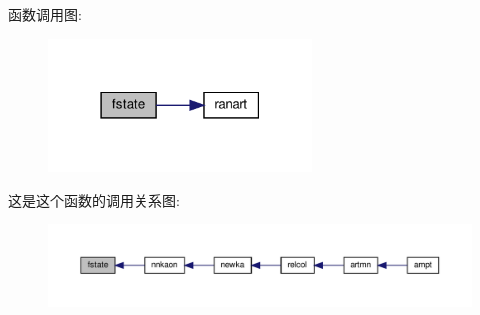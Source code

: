函数调用图\+:
\nopagebreak
\begin{figure}[H]
\begin{center}
\leavevmode
\includegraphics[width=198pt]{fstate_8f90_af9ed3aa2f2f60d1e372173f162d6ab72_cgraph}
\end{center}
\end{figure}
这是这个函数的调用关系图\+:
\nopagebreak
\begin{figure}[H]
\begin{center}
\leavevmode
\includegraphics[width=350pt]{fstate_8f90_af9ed3aa2f2f60d1e372173f162d6ab72_icgraph}
\end{center}
\end{figure}
